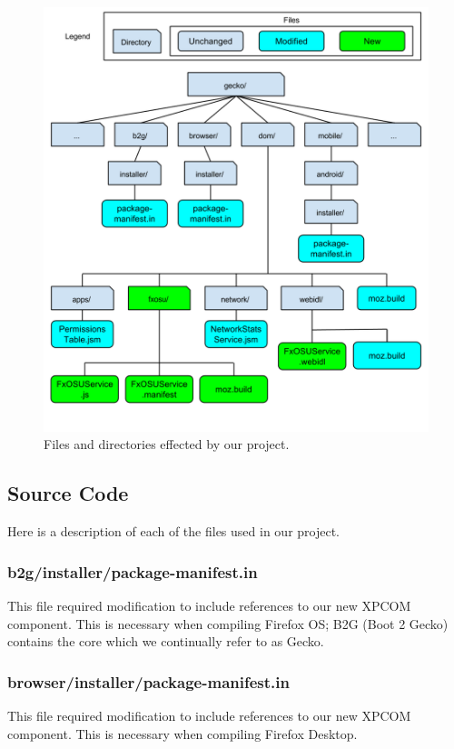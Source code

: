 \documentclass[12pt]{article}
\begin{document}
\begin{figure}[h!]
  \centering
		\includegraphics[scale=0.4]{codestructure.png}
  \caption{Files and directories effected by our project.}
\end{figure}
\pagebreak

\subsection{Source Code}
Here is a description of each of the files used in our project.

\subsubsection{b2g/installer/package-manifest.in}
This file required modification to include references to our new XPCOM component. This is necessary when compiling Firefox OS; B2G (Boot 2 Gecko) contains the core which we continually refer to as Gecko.

\subsubsection{browser/installer/package-manifest.in}
This file required modification to include references to our new XPCOM component. This is necessary when compiling Firefox Desktop.
\end{document}
